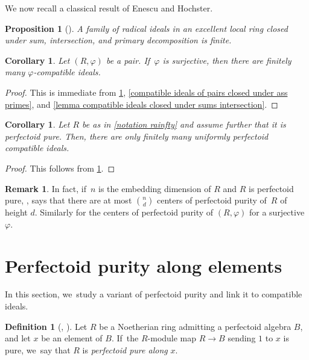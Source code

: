 \documentclass[JEP,XML,SOM,Unicode,published]{cedram}
\let\autoref\cref
\theoremstyle{plain}
\newtheorem{corollary}[theorem]{Corollary}
\newtheorem{proposition}[theorem]{Proposition}
\theoremstyle{definition}
\newtheorem{definition}[theorem]{Definition}
\newtheorem{remark}[theorem]{Remark}
\numberwithin{equation}{theorem}
\renewcommand{\phi}{\varphi}
\newcommand{\rphi}{(R,\phi)}
\begin{document}
We now recall a classical result of Enescu and Hochster.

\begin{proposition}[{\cite[Cor.\,3.2]{EnescuHochsterTheFrobeniusStructureOfLocalCohomology}}]\label{finiteness result enescu hochster}
A family of radical ideals in an excellent local ring closed under sum,
intersection, and primary decomposition is finite.
\end{proposition}

\begin{corollary}\label{finiteness of phi compatible ideals}
Let $\rphi$ be a pair. If~$\phi$ is surjective, then there are finitely many $\phi$-compatible ideals.
\end{corollary}

\begin{proof}
This is immediate from \autoref{finiteness result enescu hochster}, \autoref{compatible ideals of pairs closed under ass primes}, and \autoref{lemma compatible ideals closed under sums intersection}.
\end{proof}

\begin{corollary}\label{finiteness of uniformly compatible ideals}
Let $R$ be as in \autoref{notation rainfty} and assume further that it is perfectoid pure. Then, there are only finitely many uniformly perfectoid compatible ideals.
\end{corollary}

\begin{proof}
This follows from \autoref{finiteness of phi compatible ideals}.
\end{proof}
\begin{remark}\label{remark bound number cpps}
In fact, if~$n$ is the embedding dimension of $R$ and $R$ is perfectoid pure, \cite[Th.\,4.2]{SchwedeTuckerNumberOfFSplit}, says that there are at most $\binom{n}{d}$ centers of perfectoid purity of~$R$ of height $d$. Similarly for the centers of perfectoid purity of $\rphi$ for a surjective $\phi$.
\end{remark}

\section{Perfectoid purity along elements}

In this section, we~study a variant of perfectoid purity and link it to compatible ideals.

\begin{definition}[{\cf \cite{RamanathanFrobeniusSplittingSchubert}, \cite{SmithGloballyFRegular}}]
Let $R$ be a Noetherian ring admitting a perfectoid algebra $B$, and let $x$ be an element of $B$. If~the $R$\nobreakdash-module map $R\to B$ sending $1$ to $x$ is pure, we~say that $R$ is \emph{perfectoid pure along} $x$.
\end{definition}
\end{document}
